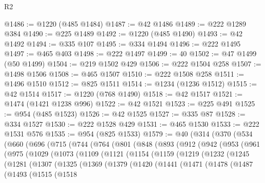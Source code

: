 \begin{lexlean}{R2}
\begin{coremodule}
@1486 := @1220 (@485 @1484)
@1487 := @42 @1486
@1489 := @222 @1289 @384
@1490 := @225 @1489
@1492 := @1220 (@485 @1490)
@1493 := @42 @1492
@1494 := @335 @107
@1495 := @334 @1494
@1496 := @222 @1495
@1497 := @465 @403
@1498 := @222 @1497
@1499 := 40
@1502 := @47 @1499 (@50 @1499)
@1504 := @219 @1502 @429
@1506 := @222 @1504 @258
@1507 := @1498 @1506
@1508 := @465 @1507
@1510 := @222 @1508 @258
@1511 := @1496 @1510
@1512 := @825 @1511
@1514 := @1234 (@1236 @1512)
@1515 := @42 @1514
@1517 := @1220 (@768 @1490)
@1518 := @42 @1517
@1521 := @1474 (@1421 @1238 @996)
@1522 := @42 @1521
@1523 := @225 @491
@1525 := @954 (@485 @1523)
@1526 := @42 @1525
@1527 := @335 @87
@1528 := @334 @1527
@1530 := @222 @1528 @429
@1531 := @465 @1530
@1533 := @222 @1531 @576
@1535 := @954 (@825 @1533)
@1579 := @40
    (@314
      (@370
        (@534
          (@660
            (@696
              (@715
                (@744
                  (@764
                    (@801
                      (@848
                        (@893
                          (@912
                            (@942
                              (@953
                                (@961
                                  (@975
                                    (@1029
                                      (@1073
                                        (@1109
                                          (@1121
                                            (@1154
                                              (@1159
                                                (@1219
                                                  (@1232
                                                    (@1245
                                                      (@1281
                                                        (@1307
                                                          (@1325
                                                            (@1369
                                                              (@1379
                                                                (@1420
                                                                  (@1441
                                                                    (@1471
                                                                      (@1478
                                                                        (@1487
                                                                          (@1493
                                                                            (@1515
                                                                              (@1518

\end{coremodule}
\end{lexlean}
